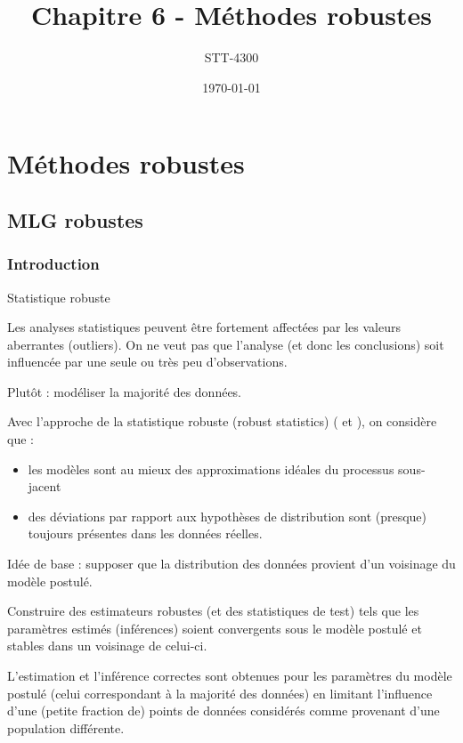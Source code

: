 \documentclass{BeamerTemplate}
\title{Chapitre 6 - Méthodes robustes}
\subtitle{STT-4300}
\date{\today}
\begin{document}
\begin{refsection}

\begin{frame}[t]
\titlepage
\end{frame}

\section{Méthodes robustes}
\label{robust.section}

\subsection{MLG robustes}

\subsubsection{Introduction}

\begin{frame}{Statistique robuste}

Les analyses statistiques peuvent être fortement affectées par les valeurs aberrantes (outliers). On ne veut pas que l'analyse (et donc les conclusions) soit influencée par une seule ou très peu d'observations.

\bigskip
Plutôt : modéliser la majorité des données.

\bigskip
Avec l'approche de la {\color{blue}statistique robuste (robust statistics)} ( et ), on considère que :
\begin{itemize}
\item les modèles sont au mieux des approximations idéales du processus sous-jacent
\item des déviations par rapport aux hypothèses de distribution sont (presque) toujours présentes dans les données réelles.
\end{itemize}
\end{frame}

\begin{frame}{}
Idée de base : supposer que la distribution des données provient d'un {\color{blue}voisinage du modèle postulé}.

\bigskip
Construire des estimateurs robustes (et des statistiques de test) tels que les paramètres estimés (inférences) soient convergents sous le modèle postulé et stables dans un voisinage de celui-ci.

L'estimation et l'inférence correctes sont obtenues pour les paramètres du modèle postulé (celui correspondant à la {\color{blue}majorité des données}) en limitant l'influence d'une (petite fraction de) points de données considérés comme provenant d'une population différente.
\end{frame}


\end{refsection}
\end{document}
